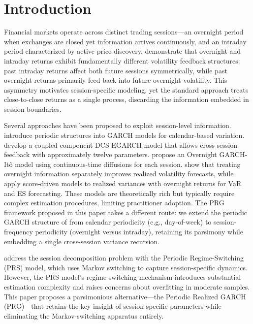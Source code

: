 \documentclass[11pt,a4paper]{article}
\begin{document}
\section{Introduction}

Financial markets operate across distinct trading sessions---an overnight period when exchanges are closed yet information arrives continuously, and an intraday period characterized by active price discovery. \citet{Blanc2014} demonstrate that overnight and intraday returns exhibit fundamentally different volatility feedback structures: past intraday returns affect both future sessions symmetrically, while past overnight returns primarily feed back into future overnight volatility. This asymmetry motivates session-specific modeling, yet the standard approach treats close-to-close returns as a single process, discarding the information embedded in session boundaries.

Several approaches have been proposed to exploit session-level information. \citet{Bollerslev1996} introduce periodic structures into GARCH models for calendar-based variation. \citet{Linton2020} develop a coupled component DCS-EGARCH model that allows cross-session feedback with approximately twelve parameters. \citet{Kim2023} propose an Overnight GARCH-It\^{o} model using continuous-time diffusions for each session. \citet{Todorova2014} show that treating overnight information separately improves realized volatility forecasts, while \citet{Opschoor2021} apply score-driven models to realized variances with overnight returns for VaR and ES forecasting. These models are theoretically rich but typically require complex estimation procedures, limiting practitioner adoption. The PRG framework proposed in this paper takes a different route: we extend the periodic GARCH structure of \citet{Bollerslev1996} from calendar periodicity (e.g., day-of-week) to session-frequency periodicity (overnight versus intraday), retaining its parsimony while embedding a single cross-session variance recursion.

\citet{Lai2024} address the session decomposition problem with the Periodic Regime-Switching (PRS) model, which uses Markov switching to capture session-specific dynamics. However, the PRS model's regime-switching mechanism introduces substantial estimation complexity and raises concerns about overfitting in moderate samples. This paper proposes a parsimonious alternative---the Periodic Realized GARCH (PRG)---that retains the key insight of session-specific parameters while eliminating the Markov-switching apparatus entirely.
\end{document}
